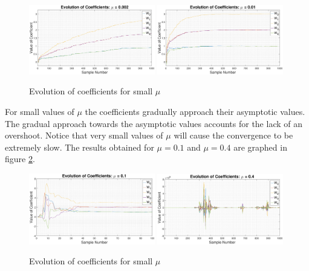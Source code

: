 \documentclass{article}
\begin{document}
\begin{figure}[H]
    \centering
    \includegraphics[width=0.49\textwidth]{evol_coefs_mu_point_002}
    \includegraphics[width=0.49\textwidth]{evol_coefs_mu_point_01}
    \caption{Evolution of coefficients for small $\mu$}
    \label{fig:coefs_evol_1}
\end{figure}

For small values of $\mu$ the coefficients gradually approach their asymptotic values. The gradual approach towards the asymptotic values accounts for the lack of an overshoot. Notice that very small values of $\mu$ will cause the convergence to be extremely slow. The results obtained for $\mu = 0.1$ and $\mu = 0.4$ are graphed in figure \ref{fig:coefs_evol_2}.

\begin{figure}[H]
    \centering
    \includegraphics[width=0.49\textwidth]{evol_coefs_mu_point_1}
    \includegraphics[width=0.49\textwidth]{evol_coefs_mu_point_4}
    \caption{Evolution of coefficients for small $\mu$}
    \label{fig:coefs_evol_2}
\end{figure}
\end{document}
